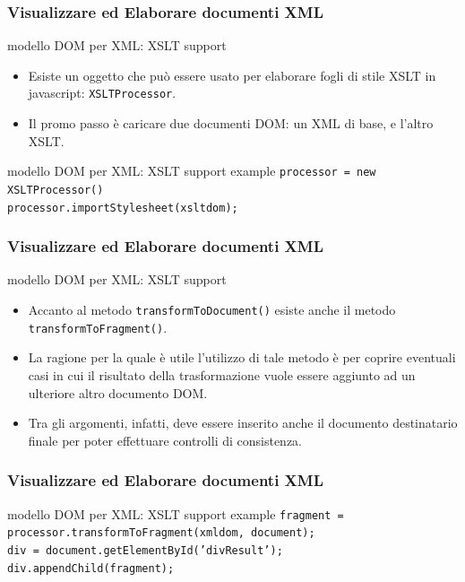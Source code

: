 \begin{frame}
    \frametitle{Visualizzare ed Elaborare documenti XML}
    \addtocounter{nframe}{1}

    \begin{block}{modello DOM per XML: XSLT support}
        \begin{itemize}
            \item Esiste un oggetto che può essere usato per elaborare fogli di stile XSLT in javascript: \texttt{XSLTProcessor}.
            \item Il promo passo è caricare due documenti DOM: un XML di base, e l'altro XSLT.
        \end{itemize}
    \end{block}

    \begin{block}{modello DOM per XML: XSLT support example}
         \texttt{processor = new XSLTProcessor()} 
         \\\texttt{processor.importStylesheet(xsltdom);}
         \\
    \end{block}
     
\end{frame}

\begin{frame}
    \frametitle{Visualizzare ed Elaborare documenti XML}
    \addtocounter{nframe}{1}
    
    \begin{block}{modello DOM per XML: XSLT support}
        \begin{itemize}
            \item Accanto al metodo \texttt{transformToDocument()} esiste anche il metodo \texttt{transformToFragment()}. 
            \item La ragione per la quale è utile l'utilizzo di tale metodo è per coprire eventuali casi in cui il risultato della trasformazione vuole essere aggiunto ad un ulteriore altro documento DOM.
            \item Tra gli argomenti, infatti, deve essere inserito anche il documento destinatario finale per poter effettuare controlli di consistenza.
        \end{itemize}
    \end{block}     
\end{frame}

\begin{frame}
    \frametitle{Visualizzare ed Elaborare documenti XML}
    \addtocounter{nframe}{1}
    

    \begin{block}{modello DOM per XML: XSLT support example}
        \texttt{fragment = processor.transformToFragment(xmldom, document); }
        \\\texttt{div = document.getElementById('divResult'); }
        \\\texttt{div.appendChild(fragment);}
    \end{block}
     
\end{frame}


